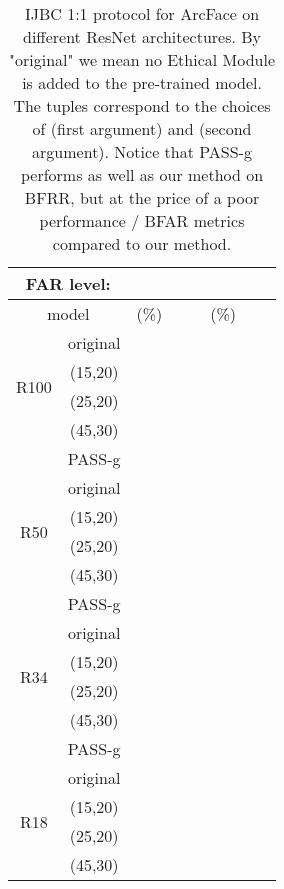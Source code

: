 \documentclass[nohyperref]{article}
\theoremstyle{plain}
\theoremstyle{definition}
\theoremstyle{remark}
\begin{document}
\begin{table}
\center
\caption{IJBC 1:1 protocol for ArcFace on different ResNet architectures. By "original" we mean no Ethical Module is added to the pre-trained model. The tuples correspond to the choices of  (first argument) and  (second argument). Notice that PASS-g performs as well as our method on BFRR, but at the price of a poor performance / BFAR metrics compared to our method.}
\begin{tabular}{ c | c | ccc | ccc}
 \multicolumn{2}{c}{ FAR level: }         & \multicolumn{3}{c}{ } & \multicolumn{3}{c}{ } \\ 
 \hline \hline
  \multicolumn{2}{c}{model}    &  (\%)  &   &   &  (\%)  &         &         \\ \hline
                              & original  &  &  &  &   &  &   \\
  \multirow{2}{*}{R100}        & (15,20) &  &  &  &   &  &   \\
                              & (25,20) &  &  & &   &  &   \\
                              & (45,30) &  &  &  &   &  &   \\ 
                              & PASS-g &  &  &  &   &  &   \\ \hline     
                              & original  &  &  &  &   &  &   \\
  \multirow{2}{*}{R50}        & (15,20) &  &  &  &   &  &   \\
                              & (25,20) &  &  & &   &  &   \\
                              & (45,30) &  &  &  &   &  &   \\ 
                              & PASS-g &  &  &  &   &  &   \\ \hline 
                              & original  &  &  &  &   &  &   \\
\multirow{2}{*}{R34}          & (15,20) &  &  &  &   &  &   \\
                              & (25,20) &  &  & &   &  &   \\
                              & (45,30) &  &  &  &   &  &   \\
                              & PASS-g &  &  &  &   &  &   \\ \hline 
                              & original  &  &  &  &   &  &   \\
  \multirow{2}{*}{R18}        & (15,20) &  &  &  &   &  &   \\
                              & (25,20) &  &  & &   &  &  \\
                              & (45,30) &  &  &  &   &  &   \\ \hline 
\end{tabular}
\label{tab:table7}
\end{table}
\end{document}
